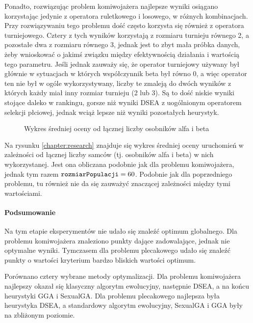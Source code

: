 \documentclass[./FM_mgr.tex]{subfiles}
\begin{document}
Ponadto, rozwiązując problem komiwojażera najlepsze wyniki osiągano korzystając jedynie z operatora ruletkowego i losowego, w różnych kombinacjach.
Przy rozwiązywaniu tego problemu dość często korzysta się również z operatora turniejowego.
Cztery z tych wyników korzystają z rozmiaru turnieju równego 2, a pozostałe dwa z rozmiaru równego 3, jednak jest to zbyt mała próbka danych, żeby wnioskować o jakimś związku między efektywnością działania i wartością tego parametru.
Jeśli jednak zauważy się, że operator turniejowy używany był głównie w sytuacjach w których współczynnik beta był równo 0, a więc operator ten nie był w ogóle wykorzystywany, liczby te zmaleją do dwóch wyników z których każdy miał inny rozmiar turnieju (2 lub 3).
Są to dość niskie wyniki stojące daleko w rankingu, gorsze niż wyniki DSEA z uogólnionym operatorem selekcji płciowej, jednak wciąż lepsze niż wyniki pozostałych heurystyk.

\newpage

\begin{figure}[H]
	\caption{Wykres średniej oceny od łącznej liczby osobników alfa i beta \label{figure:knapsack_male_avg}}
	\centering
\end{figure}

Na rysunku \ref{chapter:research} znajduje się wykres średniej oceny uruchomień w zależności od łącznej liczby samców (tj. osobników alfa i beta) w nich wykorzystanej.
Jest ona obliczana podobnie jak dla problemu komiwojażera, jednak tym razem $\mathtt{rozmiarPopulacji}=60$.
Podobnie jak dla poprzedniego problemu, tu również nie da się zauważyć znaczącej zależności między tymi wartościami.

\paragraph{Podsumowanie}

Na tym etapie eksperymentów nie udało się znaleźć optimum globalnego.
Dla problemu komiwojażera znaleziono punkty dające zadowalające, jednak nie optymalne wyniki.
Tymczasem dla problemu plecakowego udało się znaleźć punkty o wartości kryterium bardzo bliskich wartości optimum.

Porównano cztery wybrane metody optymalizacji.
Dla problemu komiwojażera najlepszy okazał się klasyczny algorytm ewolucyjny, następnie DSEA, a na końcu heurystyki GGA i SexualGA.
Dla problemu plecakowego najlepsza była heurystyka DSEA, a standardowy algorytm ewolucyjny, SexualGA i GGA były na zbliżonym poziomie.
\end{document}
